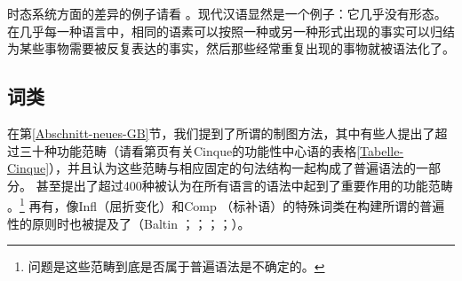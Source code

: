时态系统方面的差异的例子请看 。现代汉语显然是一个例子：它几乎没有形态。在几乎每一种语言中，相同的语素可以按照一种或另一种形式出现的事实可以归结为某些事物需要被反复表达的事实，然后那些经常重复出现的事物就被语法化了。


\subsection{词类}
\label{Abschnitt-UG-Wortarten}

在第\ref{Abschnitt-neues-GB}节，我们提到了所谓的制图方法，其中有些人提出了超过三十种功能范畴（请看第\pageref{Tabelle-Cinque}页有关Cinque的功能性中心语的表格\ref{Tabelle-Cinque}），并且认为这些范畴与相应固定的句法结构一起构成了普遍语法的一部分。 \citet[, 57]{CR2010a}甚至提出了超过400种被认为在所有语言的语法中起到了重要作用的功能范畴
。\footnote{%
问题是这些范畴到底是否属于普遍语法是不确定的。
}
再有，像\mbox{Infl}（屈折变化）和Comp （标补语）的特殊词类在构建所谓的普遍性的原则时也被提及了（Baltin \citeyear[]{Baltin81a}；\citeyear{Baltin2006a}；\citealp{Rizzi82b}；\citealp[]{Chomsky86b}；\citealp[]{Hornstein2013a}）。

